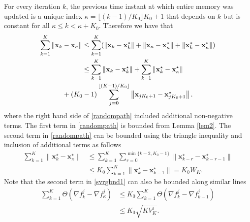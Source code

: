 \documentclass[draftcls,onecolumn,12pt]{IEEEtran}
\theoremstyle{plain}
\def\x{\mathbf{x}}
\providecommand{\norm}[1]{\left\|#1\right\|}
\theoremstyle{plain}
\theoremstyle{remark}
\begin{document}
For every iteration $k$, the previous time instant at which entire memory was updated is a unique index $\kappa = \lfloor (k-1)/K_0\rfloor K_0+1$ that depends on $k$ but is constant for all $\kappa \leq k < \kappa+K_0$. Therefore we have that 
\begin{align}
 \sum_{k=1}^K\norm{\x_{k}-\x_{\kappa}}&\leq \sum_{k=1}^K(\norm{\x_{k}-\x_{k}^*}+ \norm{\x_{\kappa}-\x_{\kappa}^*}+ \norm{\x_{k}^*-\x_{\kappa}^*})  \nonumber\\
  &  \leq \sum_{k=1}^K\norm{\x_{k}-\x_{k}^\star} + \sum_{k=1}^{K}\norm{\x_k^\star-\x_{\kappa}^\star}\nonumber\\
	&\hspace{-1cm}+ (K_0-1)\sum_{j=0}^{\lfloor (K-1)/K_0 \rfloor}\norm{\x_{jK_0+1}-\x_{jK_0+1}^\star}. \label{randompath} 
\end{align}
where the right hand side of \eqref{randompath} included additional non-negative terms. The first term in \eqref{randompath} is bounded from Lemma \ref{lem2}. The second term in \eqref{randompath} can be bounded using the triangle inequality and inclusion of additional terms as follows
\begin{align}
\sum_{k=1}^K\norm{\x_k^\star-\x_\kappa^\star} &\leq \sum_{k=1}^K\sum_{r=0}^{\min\{k-2,K_0-1\}}\norm{\x_{k-r}^\star-\x_{k-r-1}^\star} \nonumber\\
&\leq K_0 \sum_{k=1}^K \norm{\x_k^\star-\x_{k-1}^\star} = K_0W_K.
\end{align}
Note that the second term in \eqref{svrgbnd1} can also be bounded along similar lines
\begin{align}
\sum_{k=1}^K \Theta(\nabla f_k^j - \nabla f_{\kappa}^j) &\leq K_0\sum_{k=1}^K \Theta(\nabla f_k^j - \nabla f_{k-1}^j) \\
&\leq K_0\sqrt{KV_K^j}.
\end{align}
\end{document}
